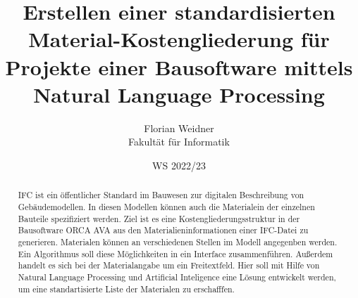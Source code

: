 \documentclass[twoside=true, %
    DIV=15
    ,%
    BCOR=15mm, %
    headinclude=true,
    footinclude=false,
    pagesize,%
    fontsize=12pt,%
    paper=a4,%
    numbers=noenddot
  ]{scrartcl}
\begin{document}

\def\figdir{figures}
\def\tabledir{tables}

\titlehead{
\raggedleft
\texttt{[image: \\figdir/logo-th-rosenheim-2019\_master\_quer\_2c.eps]}
}

\title{
\vspace*{0cm}
Erstellen einer standardisierten Material-Kostengliederung für Projekte einer Bausoftware mittels Natural Language Processing
}

\author{
Florian Weidner\\
Fakultät für Informatik}

\date{WS 2022/23}

\maketitle

\begin{abstract}
IFC ist ein öffentlicher Standard im Bauwesen zur digitalen Beschreibung von Gebäudemodellen. In diesen Modellen können auch die Materialein der einzelnen Bauteile spezifiziert werden. Ziel ist es eine Kostengliederungsstruktur in der Bausoftware ORCA AVA aus den Materialieninformationen einer IFC-Datei zu generieren. Materialen können an verschiedenen Stellen im Modell angegenben werden. Ein Algorithmus soll diese Möglichkeiten in ein Interface zusammenführen. Außerdem handelt es sich bei der Materialangabe um ein Freitextfeld. Hier soll mit Hilfe von Natural Language Processing und Artificial Inteligence eine Lösung entwickelt werden, um eine standartisierte Liste der Materialen zu erschafffen.
\end{abstract}

\pagebreak
\tableofcontents










\appendix





\end{document}
